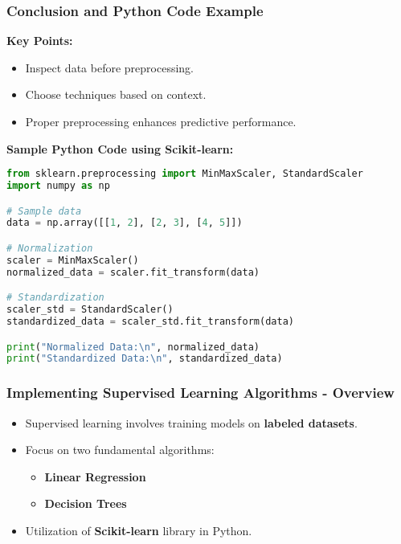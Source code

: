 \documentclass[aspectratio=169]{beamer}
\begin{document}
\begin{frame}[fragile]
    \frametitle{Conclusion and Python Code Example}
    \textbf{Key Points:}
    \begin{itemize}
        \item Inspect data before preprocessing.
        \item Choose techniques based on context.
        \item Proper preprocessing enhances predictive performance.
    \end{itemize}

    \textbf{Sample Python Code using Scikit-learn:}
    \begin{lstlisting}[language=Python]
from sklearn.preprocessing import MinMaxScaler, StandardScaler
import numpy as np

# Sample data
data = np.array([[1, 2], [2, 3], [4, 5]])

# Normalization
scaler = MinMaxScaler()
normalized_data = scaler.fit_transform(data)

# Standardization
scaler_std = StandardScaler()
standardized_data = scaler_std.fit_transform(data)

print("Normalized Data:\n", normalized_data)
print("Standardized Data:\n", standardized_data)
    \end{lstlisting}
\end{frame}

\begin{frame}[fragile]
    \frametitle{Implementing Supervised Learning Algorithms - Overview}
    \begin{itemize}
        \item Supervised learning involves training models on \textbf{labeled datasets}.
        \item Focus on two fundamental algorithms:
        \begin{itemize}
            \item \textbf{Linear Regression}
            \item \textbf{Decision Trees}
        \end{itemize}
        \item Utilization of \textbf{Scikit-learn} library in Python.
    \end{itemize}
\end{frame}
\end{document}

